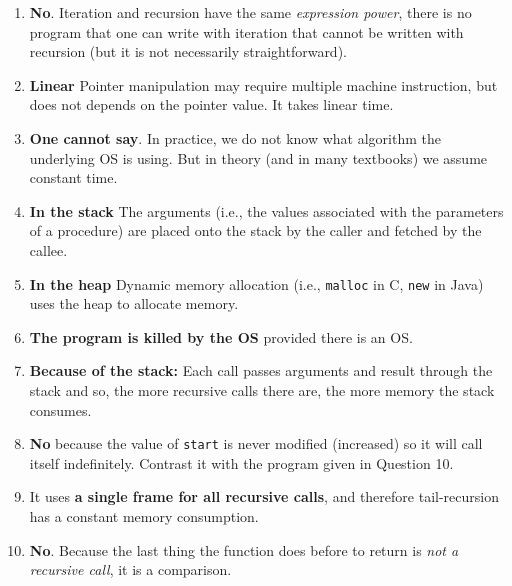 \documentclass[11pt]{article}
\begin{document}
\begin{enumerate}
\item \textbf{No}. Iteration and recursion have the same \emph{expression power},
there is no program that one can write with iteration that cannot
be written with recursion (but it is not necessarily
straightforward).

\item \textbf{Linear} Pointer manipulation may require multiple machine
instruction, but does not depends on the pointer value. It takes
linear time.

\item \textbf{One cannot say}. In practice, we do not know what algorithm the
underlying OS is using. But in theory (and in many textbooks) we
assume constant time.

\item \textbf{In the stack} The arguments (i.e., the values associated with
the parameters of a procedure) are placed onto the stack by the
caller and fetched by the callee.

\item \textbf{In the heap} Dynamic memory allocation (i.e., \texttt{malloc} in C,
\texttt{new} in Java) uses the heap to allocate memory.

\item \textbf{The program is killed by the OS} provided there is an OS.

\item \textbf{Because of the stack:} Each call passes arguments and result
through the stack and so, the more recursive calls there are, the
more memory the stack consumes.

\item \textbf{No} because the value of \texttt{start} is never modified (increased)
so it will call itself indefinitely. Contrast it with the program
given in Question 10.

\item It uses \textbf{a single frame for all recursive calls}, and therefore
tail-recursion has a constant memory consumption.

\item \textbf{No}. Because the last thing the function does before to return
is \emph{not a recursive call}, it is a comparison.
\end{enumerate}
\end{document}
